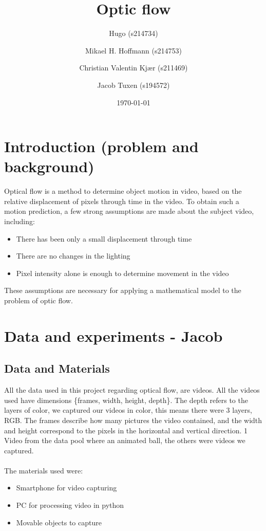 \documentclass{article}
\title{Optic flow}
\author{Hugo (s214734) \and Mikael H. Hoffmann (s214753) \and Christian Valentin Kjær (s211469) \and Jacob Tuxen (s194572)}
\date{\today}
\begin{document}
\maketitle

\section{Introduction (problem and background)}
Optical flow is a method to determine object motion in video, based on the relative displacement of pixels
through time in the video. To obtain such a motion prediction, a few strong assumptions are made about the subject video, including:
\begin{itemize}
    \item There has been only a small displacement through time
    \item There are no changes in the lighting
    \item Pixel intensity alone is enough to determine movement in the video
\end{itemize}
These assumptions are necessary for applying a mathematical model to the problem of optic flow.

\section{Data and experiments - Jacob} 
\subsection{Data and Materials}
All the data used in this project regarding optical flow, are videos. All the videos used have dimensions \{frames, width, height, depth\}. The depth refers to the layers of color, we captured our videos in color, this means there were 3 layers, RGB. The frames describe how many pictures the video contained, and the width and height correspond to the pixels in the horizontal and vertical direction. 1 Video from the data pool where an animated ball, the others were videos we captured.
\\\\
The materials used were:
\begin{itemize}
    \item Smartphone for video capturing
    \item PC for processing video in python
    \item Movable objects to capture
\end{itemize}
\end{document}
